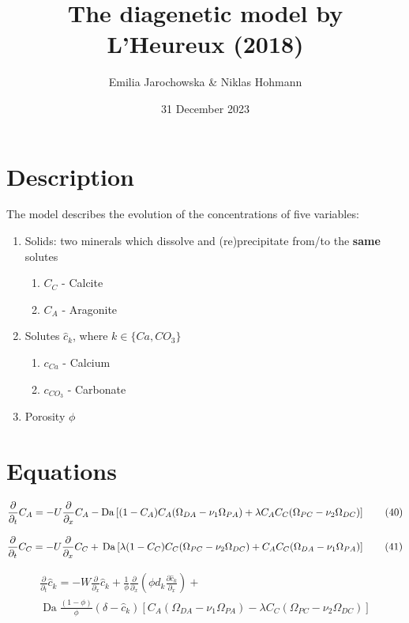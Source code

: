 \documentclass[10pt, letterpaper]{article}
\title{The diagenetic model by L'Heureux (2018)}
\author{Emilia Jarochowska & Niklas Hohmann}
\date{31 December 2023}
\begin{document}
\maketitle

\section{Description}
The model describes the evolution of the concentrations of five variables:
\begin{enumerate}
    \item Solids: two minerals which dissolve and (re)precipitate from/to the \textbf{same} solutes 
    \begin{enumerate}
        \item $C_C$ - Calcite
        \item $C_A$ - Aragonite
    \end{enumerate}
    \item Solutes $\hat{c}_k$, where $k \in \{Ca, CO_{3}\}$
    \begin{enumerate}
        \item $c_{Ca}$ - Calcium 
        \item $c_{CO_{3}}$ - Carbonate 
    \end{enumerate}
    \item Porosity $\phi$
\end{enumerate}

\section{Equations}
\begin{equation}
\frac{\partial}{\partial_t} C_A = -U\frac{\partial}{\partial_x} C_A - \operatorname{Da}\left[(1 - C_A)C_A (\Omega_{DA} - \nu_1 \Omega_{PA}) \\
        + \lambda C_A C_C (\Omega_{PC} - \nu_2 \Omega_{DC})\right] \tag{40}
\end{equation}

\begin{equation}
\frac{\partial}{\partial_t} C_C = -U\frac{\partial}{\partial_x} C_C + \\\operatorname{Da}\left[\lambda(1-C_C)C_C(\Omega_{PC} - \nu_2 \Omega_{DC}) + C_A C_C (\Omega_{DA} - \nu_1 \Omega_{PA})\right] \tag{41}
\end{equation}

\begin{equation}
\begin{align*}
   \frac{\partial}{\partial_t} \hat{c}_k = -W \frac{\partial}{\partial_x} \hat{c}_k + \frac{1}{\phi} \frac{\partial}{\partial_x} \left(\phi d_k \frac{\partial\hat{c}_k}{\partial_x}\right )+ \\
   \operatorname{Da} \frac{(1 - \phi)}{\phi} (\delta - \hat{c}_k) \left[C_A (\Omega_{DA} - \nu_1 \Omega_{PA}) - \lambda C_C (\Omega_{PC} - \nu_2 \Omega_{DC})\right] \tag{42}
\end{align*}
\end{equation}
\end{document}

